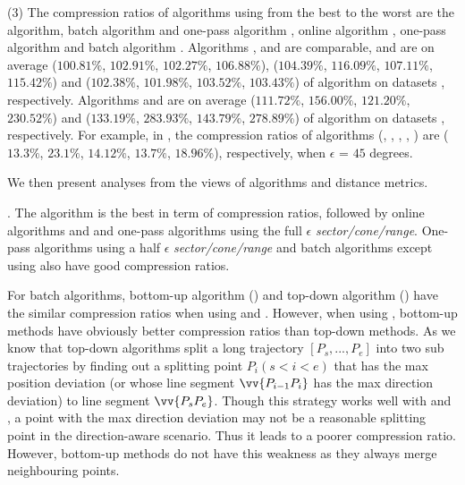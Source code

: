 \sstab(3) The compression ratios of algorithms using \dad from the best
to the worst are the \opt algorithm, batch algorithm \tpa and
one-pass algorithm \interval, online algorithm \opwa, one-pass algorithm \intersec and batch algorithm \dpa.
%
{Algorithms \tpa, \opwa and \interval are comparable, and are on average
($100.81\%$, $102.91\%$, $102.27\%$, $106.88\%$), ($104.39\%$, $116.09\%$, $107.11\%$, $115.42\%$) and ($102.38\%$, $101.98\%$, $103.52\%$, $103.43\%$)
 of algorithm \opt on datasets \dSets, respectively.}
%
{Algorithms \intersec and \dpa are on average ($111.72\%$, $156.00\%$, $121.20\%$, $230.52\%$) and ($133.19\%$, $283.93\%$, $143.79\%$, $278.89\%$)
 of algorithm \opt on datasets \dSets, respectively.}
%
For example, in \mopsi, the compression ratios of algorithms (\tpa, \dpa, \opwa, \interval, \intersec)
are ($13.3\%$, $23.1\%$, $14.12\%$, $13.7\%$, $18.96\%$), respectively, when $\epsilon$ = $45$ degrees.
%


We then present analyses from the views of \lsa algorithms and distance metrics.

. The \opt algorithm is the best in term of compression ratios, followed by online algorithms \opwa and \bqsa and one-pass algorithms using the full $\epsilon$ \emph{sector/cone/range}. One-pass algorithms using a half $\epsilon$ \emph{sector/cone/range} and batch algorithms except \dpa using \dad also have good compression ratios.

For batch algorithms, bottom-up algorithm (\tpa) and top-down algorithm (\dpa) have the similar compression ratios when using \ped and \sed. However, when using \dad, bottom-up methods have obviously better compression ratios than top-down methods.  As we know that top-down algorithms split a long trajectory $[P_s, ..., P_e]$ into two sub trajectories by finding out a splitting point $P_i (s<i<e)$ that has the max position deviation (or whose line segment $\vv{P_{i-1}P_{i}}$ has the max direction deviation) to line segment $\vv{P_sP_{e}}$. Though this strategy works well with \ped and \sed, a point with the max direction deviation may not be a reasonable splitting point in the direction-aware scenario. Thus it leads to a poorer compression ratio. However, bottom-up methods do not have this weakness as they always merge neighbouring points.



